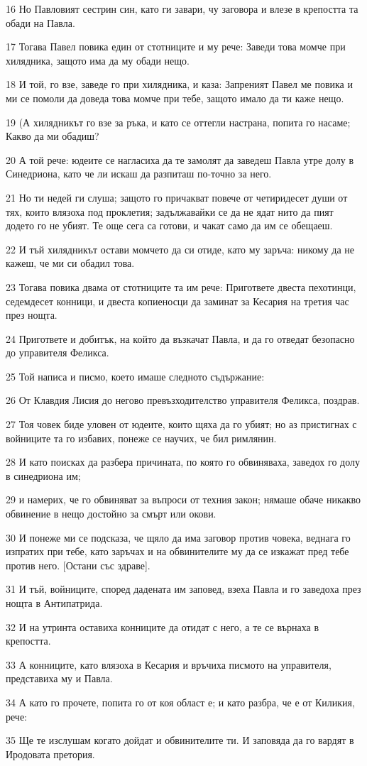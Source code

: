 \par 16 Но Павловият сестрин син, като ги завари, чу заговора и влезе в крепостта та обади на Павла.
\par 17 Тогава Павел повика един от стотниците и му рече: Заведи това момче при хилядника, защото има да му обади нещо.
\par 18 И той, го взе, заведе го при хилядника, и каза: Запреният Павел ме повика и ми се помоли да доведа това момче при тебе, защото имало да ти каже нещо.
\par 19 (А хилядникът го взе за ръка, и като се оттегли настрана, попита го насаме; Какво да ми обадиш?
\par 20 А той рече: юдеите се нагласиха да те замолят да заведеш Павла утре долу в Синедриона, като че ли искаш да разпиташ по-точно за него.
\par 21 Но ти недей ги слуша; защото го причакват повече от четиридесет души от тях, които влязоха под проклетия; задължавайки се да не ядат нито да пият додето го не убият. Те още сега са готови, и чакат само да им се обещаеш.
\par 22 И тъй хилядникът остави момчето да си отиде, като му заръча: никому да не кажеш, че ми си обадил това.
\par 23 Тогава повика двама от стотниците та им рече: Пригответе двеста пехотинци, седемдесет конници, и двеста копиеносци да заминат за Кесария на третия час през нощта.
\par 24 Пригответе и добитък, на който да възкачат Павла, и да го отведат безопасно до управителя Феликса.
\par 25 Той написа и писмо, което имаше следното съдържание:
\par 26 От Клавдия Лисия до негово превъзходителство управителя Феликса, поздрав.
\par 27 Тоя човек биде уловен от юдеите, които щяха да го убият; но аз пристигнах с войниците та го избавих, понеже се научих, че бил римлянин.
\par 28 И като поисках да разбера причината, по която го обвиняваха, заведох го долу в синедриона им;
\par 29 и намерих, че го обвиняват за въпроси от техния закон; нямаше обаче никакво обвинение в нещо достойно за смърт или окови.
\par 30 И понеже ми се подсказа, че щяло да има заговор против човека, веднага го изпратих при тебе, като заръчах и на обвинителите му да се изкажат пред тебе против него. [Остани със здраве].
\par 31 И тъй, войниците, според дадената им заповед, взеха Павла и го заведоха през нощта в Антипатрида.
\par 32 И на утринта оставиха конниците да отидат с него, а те се върнаха в крепостта.
\par 33 А конниците, като влязоха в Кесария и връчиха писмото на управителя, представиха му и Павла.
\par 34 А като го прочете, попита го от коя област е; и като разбра, че е от Киликия, рече:
\par 35 Ще те изслушам когато дойдат и обвинителите ти. И заповяда да го вардят в Иродовата претория.

